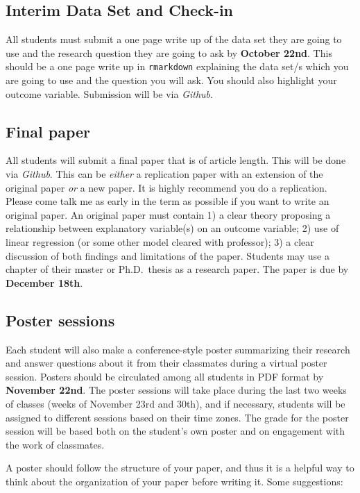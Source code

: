 \documentclass[11pt]{article}
\begin{document}
\subsection*{Interim Data Set and Check-in}

All students must submit a one page write up of the data set they are
going to use and the research question they are going to ask by
\textbf{October 22nd}. This should be a one page write up in
\texttt{rmarkdown} explaining the data set/s which you are going to use
and the question you will ask. You should also highlight your outcome
variable. Submission will be via \emph{Github}.

\subsection*{Final paper}

All students will submit a final paper that is of article length. This
will be done via \emph{Github}. This can be \emph{either} a replication
paper with an extension of the original paper \emph{or} a new paper. It
is highly recommend you do a replication. Please come talk me as early
in the term as possible if you want to write an original paper. An
original paper must contain 1) a clear theory proposing a relationship
between explanatory variable(s) on an outcome variable; 2) use of linear
regression (or some other model cleared with professor); 3) a clear
discussion of both findings and limitations of the paper. Students may
use a chapter of their master or Ph.D.~thesis as a research paper. The
paper is due by \textbf{December 18th}.

\subsection*{Poster sessions}

Each student will also make a conference-style poster summarizing their research and answer questions about it from their classmates during a virtual poster session. Posters should be circulated among all students in PDF format by \textbf{November 22nd}. The poster sessions will take place during the last two weeks of classes (weeks of November 23rd and 30th), and if necessary, students will be assigned to different sessions based on their time zones. The grade for the poster session will be based both on the student's own poster and on engagement with the work of classmates.

A poster should follow the structure of your paper, and thus it is a helpful way to think about the organization of your paper before writing it. Some suggestions:
\end{document}
